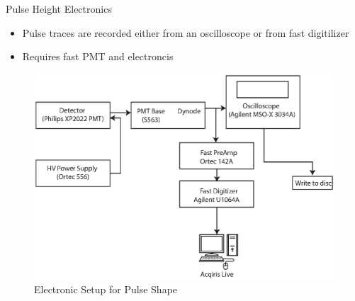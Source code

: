 \begin{frame}{Pulse Height Electronics}
	\begin{itemize}
		\small
		\item Pulse traces are recorded either from an oscilloscope or from fast digitilizer
		\item Requires fast PMT and electroncis
	\end{itemize}
	\begin{figure}
		\centering
		\includegraphics[height=0.5\textheight]{images/ElectronicsPSD.eps}
		\caption{Electronic Setup for Pulse Shape}
		\label{fig:ElectronicsPSD}
	\end{figure}
\end{frame}
